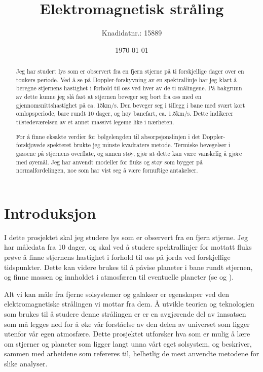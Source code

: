 \documentclass[reprint, english,notitlepage]{revtex4-1}  %
\begin{document}
\title{Elektromagnetisk stråling}
\date{\today}
\author{Knadidatnr.: 15889}


\newpage

\begin{abstract}
Jeg har studert lys som er observert fra en fjern stjerne på ti forskjellige dager over en toukers periode. Ved å se på Doppler-forskyvning av en spektrallinje har jeg klart å beregne stjernens hastighet i forhold til oss ved hver av de ti målingene. På bakgrunn av dette kunne jeg slå fast at stjernen beveger seg bort fra oss med en gjennomsnittshastighet på ca. 15km/s. Den beveger seg i tillegg i bane med svært kort omløpsperiode, bare rundt 10 dager, og høy banefart, ca. 1.5km/s. Dette indikerer tilstedeværelsen av et annet massivt legeme like i nærheten.

For å finne eksakte verdier for bølgelengden til absorpsjonslinjen i det Doppler-forskjøvede spekteret brukte jeg minste kvadraters metode. Termiske bevegelser i gassene på stjernens overflate, og annen støy, gjør at dette kan være vanskelig å gjøre med øyemål. Jeg har anvendt modeller for fluks og støy som bygger på normalfordelingen, noe som har vist seg å være fornuftige antakelser.
\end{abstract}
\maketitle                                %



\section{Introduksjon}
\label{sect:intro}

I dette prosjektet skal jeg studere lys som er observert fra en fjern stjerne. Jeg har måledata fra 10 dager, og skal ved å studere spektrallinjer for mottatt fluks prøve å finne stjernens hastighet i forhold til oss på jorda ved forskjellige tidspunkter. Dette kan videre brukes til å påvise planeter i bane rundt stjernen, og finne massen og innholdet i atmosfæren til eventuelle planeter (se \citep{part1C} og \citep{paper1C}).

Alt vi kan måle fra fjerne solsystemer og galakser er egenskaper ved den elektromagnetiske strålingen vi mottar fra dem. Å utvikle teorien og teknologien som brukes til å studere denne strålingen er er en avgjørende del av innsatsen som må legges ned for å øke vår forståelse av den delen av universet som ligger utenfor vår egen atmosfære. Dette prosjektet utforsker hva som er mulig å lære om stjerner og planeter som ligger langt unna vårt eget solsystem, og beskriver, sammen med arbeidene som refereres til, helhetlig de mest anvendte metodene for slike analyser.
\end{document}
